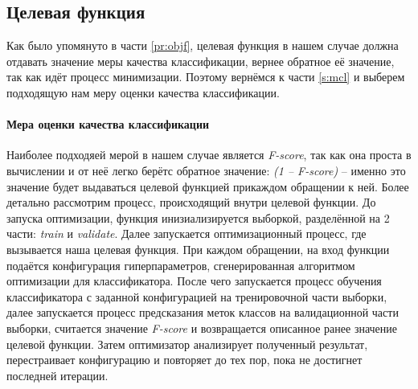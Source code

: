 \documentclass[times,specification,annotation]{itmo-student-thesis}
\begin{document}
		\subsection{Целевая функция}
		Как было упомянуто в части \ref{pr:objf}, целевая функция в нашем случае должна отдавать значение меры качества классификации, вернее обратное её значение, так как идёт процесс минимизации. Поэтому вернёмся к части \ref{s:mcl} и выберем подходящую нам меру оценки качества классификации.\par
		\paragraph{Мера оценки качества классификации} Наиболее подходяей мерой в нашем случае является \textit{F-score}, так как она проста в вычислении и от неё легко берётс обратное значение: \textit{(1 -- F-score)} -- именно это значение будет выдаваться целевой функцией прикаждом обращении к ней.
		Более детально рассмотрим процесс, происходящий внутри целевой функции. До запуска оптимизации, функция инизиализируется выборкой, разделённой на 2 части: \textit{train} и \textit{validate}. Далее запускается оптимизационный процесс, где вызывается наша целевая функция. При каждом обращении, на вход функции подаётся конфигурация гиперпараметров, сгенерированная алгоритмом оптимизации для классификатора. После чего запускается процесс обучения классификатора с заданной конфигурацией на тренировочной части выборки, далее запускается процесс предсказания меток классов на валидационной части выборки, считается значение \textit{F-score} и возвращается описанное ранее значение целевой функции. Затем оптимизатор анализирует полученный результат, перестраивает конфигурацию и повторяет до тех пор, пока не достигнет последней итерации.
\end{document}
